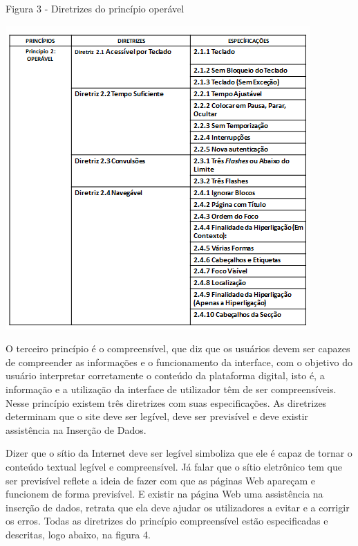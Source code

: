 \documentclass[a4paper]{article}
\begin{document}
\begin{titlepage}
Figura 3 - Diretrizes do princípio operável\\[-0.7cm]
\begin{center}
	\parbox{11cm}{\includegraphics[scale=0.9]{Operável.png}}
\end{center}

O terceiro princípio é o compreensível, que diz que os usuários devem ser capazes de compreender as informações e o funcionamento da interface, com o objetivo do usuário interpretar corretamente o conteúdo da plataforma digital, isto é, a informação e a utilização da interface de utilizador têm de ser compreensíveis. Nesse princípio existem três diretrizes com suas especificações. As diretrizes determinam que o site deve ser legível, deve ser previsível e deve existir assistência na Inserção de Dados.

Dizer que o sítio da Internet deve ser legível simboliza que ele é capaz de tornar o conteúdo textual legível e compreensível. Já falar que o sítio eletrônico tem que ser previsível reflete a ideia de fazer com que as páginas Web apareçam e funcionem de forma previsível. E existir na página Web uma assistência na inserção de dados, retrata que ela deve ajudar os utilizadores a evitar e a corrigir os erros. Todas as diretrizes do princípio compreensível estão especificadas e descritas, logo abaixo, na figura 4.\\


\end{titlepage}
\end{document}
